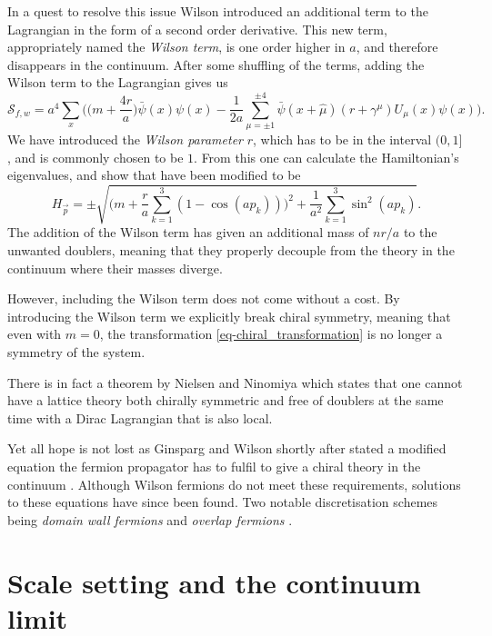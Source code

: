 In a quest to resolve this issue Wilson introduced an additional term to the
Lagrangian in the form of a second order derivative. This new term,
appropriately named the \emph{Wilson term}, is one order higher in $a$, and therefore
disappears in the continuum. After some shuffling of the terms, adding the
Wilson term to the Lagrangian gives us
%
\begin{equation}
  \mathcal{S}_{f,w} = a^4 \sum_{x} \bigg(
  \big(m + {\textstyle\frac{4 r}{a}}\big) \bar{\psi}(x) \psi(x)
  - \frac{1}{2a} \sum_{\mu = \pm 1}^{\pm 4} \bar{\psi}(x+\hat{\mu}) (r +
  \gamma^{\mu}) U_{\mu}(x) \psi(x) \bigg).
\end{equation}
%
We have introduced the \emph{Wilson parameter} $r$, which has to be in the
interval $(0, 1]$, and is commonly chosen to be $1$. From this one can calculate
the Hamiltonian's eigenvalues, and show that have been modified to be
%
\begin{equation}
  H_{\vec{p}} = \pm \sqrt{\bigg(m + \frac{r}{a}\sum_{k=1}^3 (1 - \cos (a p_k) ) \bigg)^2
    + \frac{1}{a^2} \sum_{k=1}^3 \sin^2 (a p_k)}.
\end{equation}
%
The addition of the Wilson term has given an additional mass of $n r/a$ to the
unwanted doublers, meaning that they properly decouple from the theory in the
continuum where their masses diverge. 

However, including the Wilson term does not come without a cost. By
introducing the Wilson term we explicitly break chiral symmetry, meaning that
even with $m=0$, the transformation \eqref{eq-chiral_transformation} is no
longer a symmetry of the system. 

There is in fact a theorem by Nielsen and Ninomiya
\citep{Nielsen:1980rz,Nielsen:1981xu} which states that one cannot have a lattice
theory both chirally symmetric and free of doublers at the same time with a
Dirac Lagrangian that is also local.

Yet all hope is not lost as Ginsparg and Wilson shortly after stated a modified
equation the fermion propagator has to fulfil to give a chiral theory in the
continuum \citep{Ginsparg:1981bj}. Although Wilson fermions do not meet these
requirements, solutions to these equations have since been found. Two notable
discretisation schemes being \emph{domain wall fermions} \citep{Kaplan:1992bt} and 
\emph{overlap fermions} \citep{Neuberger:1997fp,Neuberger:1998wv}.

\section{Scale setting and the continuum limit} \label{sec-scale_setting}


